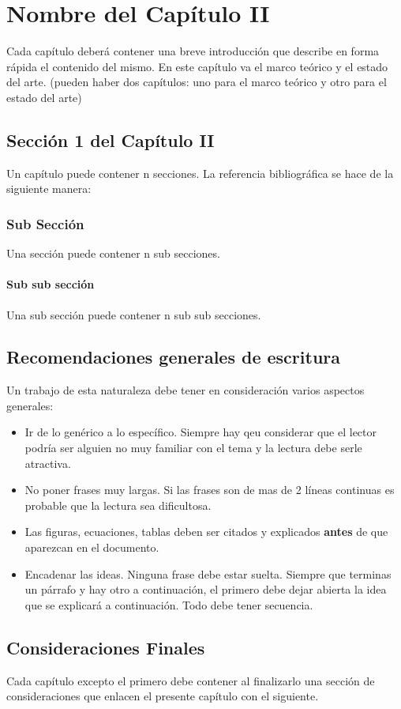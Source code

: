 \chapter{Nombre del Capítulo II}

Cada capítulo deberá contener una breve introducción que describe en forma rápida el contenido del
mismo. En este capítulo va el marco teórico y el estado del arte. (pueden haber dos capítulos: uno para el marco teórico y otro para el estado del arte)

\section{Sección 1 del Capítulo II}

Un capítulo puede contener n secciones. La referencia bibliográfica se hace de la siguiente manera:
\cite{Mateos00}

\subsection{Sub Sección}

Una sección puede contener n sub secciones.\cite{Galante01}

\subsubsection{Sub sub sección}

Una sub sección puede contener n sub sub secciones.

\section{Recomendaciones generales de escritura}
Un trabajo de esta naturaleza debe tener en consideración varios aspectos generales:

\begin{itemize}
\item Ir de lo genérico a lo específico. Siempre hay qeu considerar que el lector podría ser alguien no muy familiar con el tema 
y la lectura debe serle atractiva.
\item No poner frases muy largas. Si las frases son de mas de 2 líneas continuas es probable que la lectura sea dificultosa.
\item Las figuras, ecuaciones, tablas deben ser citados y explicados {\bf antes} de que aparezcan en el documento.
\item Encadenar las ideas. Ninguna frase debe estar suelta. Siempre que terminas un párrafo y hay otro a continuación, 
el primero debe dejar abierta la idea que se explicará a continuación. Todo debe tener secuencia.
\end{itemize}


\section{Consideraciones Finales}

Cada capítulo excepto el primero debe contener al finalizarlo una sección de consideraciones que enlacen
el presente capítulo con el siguiente.
